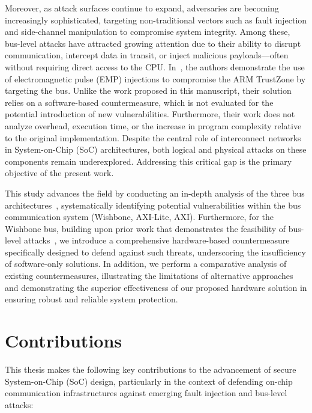 Moreover, as attack surfaces continue to expand, adversaries are becoming increasingly sophisticated, targeting non-traditional vectors such as fault injection and side-channel manipulation to compromise system integrity. Among these, bus-level attacks have attracted growing attention due to their ability to disrupt communication, intercept data in transit, or inject malicious payloads—often without requiring direct access to the CPU. In~\cite{mishra2024faults}, the authors demonstrate the use of electromagnetic pulse (EMP) injections to compromise the ARM TrustZone by targeting the bus. Unlike the work proposed in this manuscript, their solution relies on a software-based countermeasure, which is not evaluated for the potential introduction of new vulnerabilities. Furthermore, their work does not analyze overhead, execution time, or the increase in program complexity relative to the original implementation. Despite the central role of interconnect networks in System-on-Chip (SoC) architectures, both logical and physical attacks on these components remain underexplored. Addressing this critical gap is the primary objective of the present work.

This study advances the field by conducting an in-depth analysis of the three bus architectures~\cite{mitic2006survey}, systematically identifying potential vulnerabilities within the bus communication system (Wishbone, AXI-Lite, AXI). Furthermore, for the Wishbone bus, building upon prior work that demonstrates the feasibility of bus-level attacks~\cite{zhao2024communication}, we introduce a comprehensive hardware-based countermeasure specifically designed to defend against such threats, underscoring the insufficiency of software-only solutions. In addition, we perform a comparative analysis of existing countermeasures, illustrating the limitations of alternative approaches and demonstrating the superior effectiveness of our proposed hardware solution in ensuring robust and reliable system protection.

\section*{Contributions}

This thesis makes the following key contributions to the advancement of secure System-on-Chip (SoC) design, particularly in the context of defending on-chip communication infrastructures against emerging fault injection and bus-level attacks:

